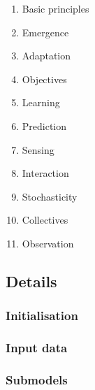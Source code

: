 \begin{enumerate}
    \item Basic principles
    \item Emergence
    \item Adaptation
    \item Objectives
    \item Learning
    \item Prediction
    \item Sensing
    \item Interaction
    \item Stochasticity
    \item Collectives
    \item Observation
\end{enumerate}

\subsection{Details}
\label{sub:stationsim:details}

\subsubsection{Initialisation}
\label{subs:stationsim:details:initialisation}

\subsubsection{Input data}
\label{subs:stationsim:details:input}

\subsubsection{Submodels}
\label{subs:stationsim:details:submodels}

